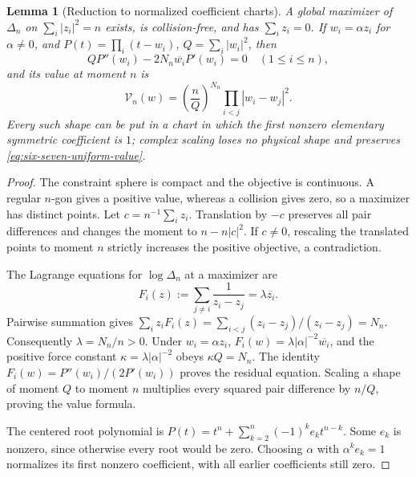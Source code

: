 \documentclass[11pt]{article}
\newtheorem{lemma}[theorem]{Lemma}
\theoremstyle{remark}
\numberwithin{equation}{section}
\begin{document}
\begin{lemma}[Reduction to normalized coefficient charts]
\label{lem:six-seven-chart-reduction}
A global maximizer of $\Delta_n$ on $\sum_i|z_i|^2=n$ exists, is
collision-free, and has $\sum_i z_i=0$. If $w_i=\alpha z_i$ for
$\alpha\ne0$, and $P(t)=\prod_i(t-w_i)$, $Q=\sum_i|w_i|^2$, then
\begin{equation}\label{eq:six-seven-uniform-residual}
 QP''(w_i)-2N_n\overline{w_i}P'(w_i)=0\quad(1\le i\le n),
\end{equation}
and its value at moment $n$ is
\begin{equation}\label{eq:six-seven-uniform-value}
 \mathcal V_n(w)=\left(\frac nQ\right)^{N_n}
                    \prod_{i<j}|w_i-w_j|^2.
\end{equation}
Every such shape can be put in a chart in which the first nonzero
elementary symmetric coefficient is $1$; complex scaling loses no
physical shape and preserves \eqref{eq:six-seven-uniform-value}.
\end{lemma}
\begin{proof}
The constraint sphere is compact and the objective is continuous.
A regular $n$-gon gives a positive value, whereas a collision gives
zero, so a maximizer has distinct points. Let $c=n^{-1}\sum_i z_i$.
Translation by $-c$ preserves all pair differences and changes the
moment to $n-n|c|^2$. If $c\ne0$, rescaling the translated points to
moment $n$ strictly increases the positive objective, a contradiction.

The Lagrange equations for $\log\Delta_n$ at a maximizer are
\[
 F_i(z):=\sum_{j\ne i}\frac1{z_i-z_j}=\lambda\overline{z_i}.
\]
Pairwise summation gives
$\sum_i z_iF_i(z)=\sum_{i<j}(z_i-z_j)/(z_i-z_j)=N_n$.
Consequently $\lambda=N_n/n>0$. Under $w_i=\alpha z_i$,
$F_i(w)=\lambda|\alpha|^{-2}\overline{w_i}$, and the positive
force constant $\kappa=\lambda|\alpha|^{-2}$ obeys $\kappa Q=N_n$.
The identity $F_i(w)=P''(w_i)/(2P'(w_i))$ proves the residual equation.
Scaling a shape of moment $Q$ to moment $n$ multiplies every squared
pair difference by $n/Q$, proving the value formula.

The centered root polynomial is
$P(t)=t^n+\sum_{k=2}^n(-1)^ke_k t^{n-k}$.
Some $e_k$ is nonzero, since otherwise every root would be zero.
Choosing $\alpha$ with $\alpha^ke_k=1$ normalizes its first nonzero
coefficient, with all earlier coefficients still zero.
\end{proof}
\end{document}
